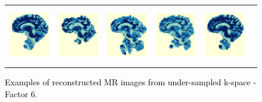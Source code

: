 \documentclass[10pt,journal,compsoc]{IEEEtran}
\begin{document}
\begin{figure}[ht]
\begin{raggedleft}
\begin{tabular}{cccccc}
			\includegraphics[width=2.5cm,height=2.5cm]{include/grp2/factor6/022-Guys-0701-T1/022-Guys-0701-T1_segs__50} &
			\includegraphics[width=2.5cm,height=2.5cm]{include/grp2/factor6/022-Guys-0701-T1/022-Guys-0701-T1_segs__zeroPadding_50} & \includegraphics[width=2.5cm,height=2.5cm]{include/grp2/factor6/022-Guys-0701-T1/022-Guys-0701-T1_segs__CS_50} & \includegraphics[width=2.5cm]{include/grp2/factor6/022-Guys-0701-T1/022-Guys-0701-T1_segs__IMCNNL2TUNE_50} & \includegraphics[width=2.5cm,height=2.5cm]{include/grp2/factor6/022-Guys-0701-T1/022-Guys-0701-T1_segs__predict_50}
			
			
		\end{tabular}
		\par\end{raggedleft}
	\raggedright{}\caption{\textcolor{black}{\footnotesize{}Examples of reconstructed MR images from under-sampled k-space - Factor 6.}}
	\label{fig:example_factor_6} 
\end{figure}

\end{document}
